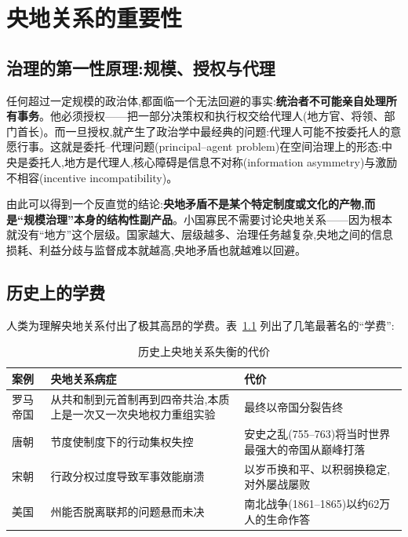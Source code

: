 \documentclass[UTF8,12pt,a4paper]{ctexrep}
\begin{document}
\chapter{央地关系的重要性}

\section{治理的第一性原理:规模、授权与代理}

任何超过一定规模的政治体,都面临一个无法回避的事实:\textbf{统治者不可能亲自处理所有事务}。他必须授权——把一部分决策权和执行权交给代理人(地方官、将领、部门首长)。而一旦授权,就产生了政治学中最经典的问题:代理人可能不按委托人的意愿行事。这就是委托--代理问题(principal--agent problem)在空间治理上的形态:中央是委托人,地方是代理人,核心障碍是信息不对称(information asymmetry)与激励不相容(incentive incompatibility)。

由此可以得到一个反直觉的结论:\textbf{央地矛盾不是某个特定制度或文化的产物,而是``规模治理''本身的结构性副产品}。小国寡民不需要讨论央地关系——因为根本就没有``地方''这个层级。国家越大、层级越多、治理任务越复杂,央地之间的信息损耗、利益分歧与监督成本就越高,央地矛盾也就越难以回避。

\section{历史上的学费}

人类为理解央地关系付出了极其高昂的学费。表~\ref{tab:tuition} 列出了几笔最著名的``学费'':

\begin{table}[htbp]
  \centering
  \small
  \caption{历史上央地关系失衡的代价}
  \label{tab:tuition}
  \begin{tabularx}{\linewidth}{@{}lXX@{}}
    \toprule
    \textbf{案例} & \textbf{央地关系病症} & \textbf{代价} \\
    \midrule
    罗马帝国 & 从共和制到元首制再到四帝共治,本质上是一次又一次央地权力重组实验 & 最终以帝国分裂告终 \\
    唐朝 & 节度使制度下的行动集权失控 & 安史之乱(755--763)将当时世界最强大的帝国从巅峰打落 \\
    宋朝 & 行政分权过度导致军事效能崩溃 & 以岁币换和平、以积弱换稳定,对外屡战屡败 \\
    美国 & 州能否脱离联邦的问题悬而未决 & 南北战争(1861--1865)以约62万人的生命作答 \\
    \bottomrule
  \end{tabularx}
\end{table}
\end{document}
